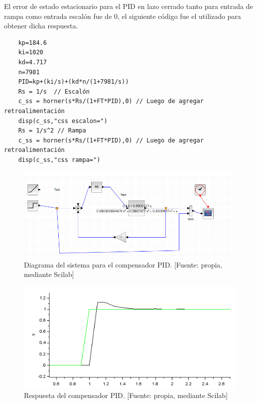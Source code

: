 \documentclass[12pt,letterpaper]{article}
\begin{document}
El error de estado estacionario para el PID en lazo cerrado tanto para entrada de rampa como entrada escalón fue de 0, el siguiente código fue el utilizado para obtener dicha respuesta.\\

\begin{verbatim}
    kp=184.6
    ki=1020
    kd=4.717
    n=7981
    PID=kp+(ki/s)+(kd*n/(1+7981/s))
    Rs = 1/s  // Escalón
    c_ss = horner(s*Rs/(1+FT*PID),0) // Luego de agregar retroalimentación
    disp(c_ss,"css escalon=")
    Rs = 1/s^2 // Rampa
    c_ss = horner(s*Rs/(1+FT*PID),0) // Luego de agregar retroalimentación
    disp(c_ss,"css rampa=")
\end{verbatim}

\begin{figure}[hbtp]
	\centering
	\includegraphics[width = .9 \columnwidth]{pidb.jpeg} 
	\caption[Figura7]{Diagrama del sistema para el compensador PID. [Fuente: propia, mediante Scilab]} 
	\label{pidb} 
\end{figure}

\begin{figure}[hbtp]
	\centering
	\includegraphics[width = .75 \columnwidth]{resppid.png} 
	\caption[Figura7]{Respuesta del compensador PID. [Fuente: propia, mediante Scilab]} 
	\label{resppid} 
\end{figure}
\end{document}
